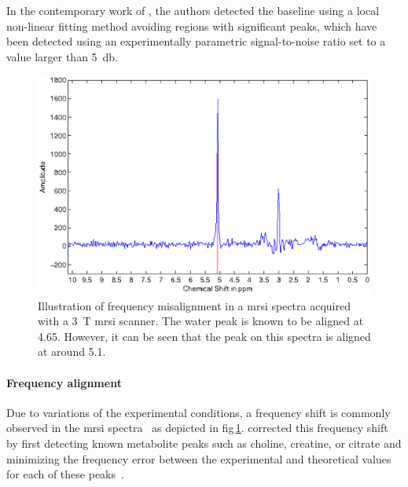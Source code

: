 In the contemporary work of \citeauthor{Tiwari2012}, the authors detected the baseline using a local non-linear fitting method avoiding regions with significant peaks, which have been detected using an experimentally parametric signal-to-noise ratio set to a value larger than \SI{5}{\decibel}.


\begin{figure}
\centering
\includegraphics[width=0.7\linewidth]{3_review/figures/processing/pre-processing/frequency/frequency.eps}
\caption[Illustration of frequency misalignment in a \acs*{mrsi} spectra.]{Illustration of frequency misalignment in a \acs*{mrsi} spectra acquired with a \SI{3}{\tesla} \acs*{mrsi} scanner. The water peak is known to be aligned at \SI{4.65}{\ppm}. However, it can be seen that the peak on this spectra is aligned at around \SI{5.1}{\ppm}.}
\label{fig:frequency}
\end{figure}

\paragraph{Frequency alignment}
Due to variations of the experimental conditions, a frequency shift is commonly observed in the \ac{mrsi} spectra~\cite{Chen2002,Osorio-Garcia2012} as depicted in \acs{fig}\,\ref{fig:frequency}.
\citeauthor{Tiwari2012} corrected this frequency shift by first detecting known metabolite peaks such as choline, creatine, or citrate and minimizing the frequency error between the experimental and theoretical values for each of these peaks~\cite{Tiwari2012}.

